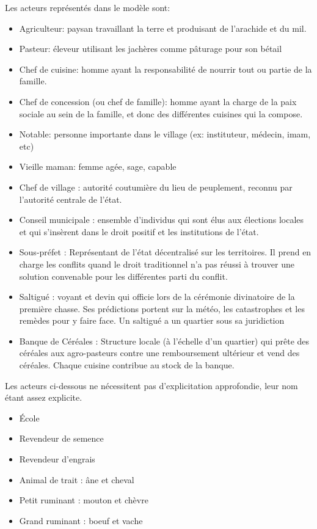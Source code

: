 Les acteurs représentés dans le modèle sont:
\begin{itemize}
\item Agriculteur: paysan travaillant la terre et produisant de l'arachide et du mil.
\item Pasteur: éleveur utilisant les jachères comme pâturage pour son bétail
\item Chef de cuisine: homme ayant la responsabilité de nourrir tout ou partie de la famille.
\item Chef de concession (ou chef de famille): homme ayant la charge de la paix sociale au sein de la famille, et donc des différentes cuisines qui la compose.
\item Notable: personne importante dans le village (ex: instituteur, médecin, imam, etc)
\item Vieille maman:  femme agée, sage, capable 
\item Chef de village : autorité coutumière du lieu de peuplement, reconnu par l'autorité centrale de l'état. 
\item Conseil municipale : ensemble d'individus qui sont élus aux élections locales et qui s'insèrent dans le droit positif et les institutions de l'état.
\item Sous-préfet : Représentant de l'état décentralisé sur les territoires. Il prend en charge les conflits quand le droit traditionnel n'a pas réussi à trouver une solution convenable pour les différentes parti du conflit.
\item Saltigué : voyant et devin qui officie lors de la cérémonie divinatoire de la première chasse. Ses prédictions portent sur la météo, les catastrophes et les remèdes pour y faire face. Un saltigué a un quartier sous sa juridiction
\item Banque de Céréales : Structure locale (à l'échelle d'un quartier) qui prête des céréales aux agro-pasteurs contre une remboursement ultérieur et vend des céréales. Chaque cuisine contribue au stock de la banque.
\end{itemize}

Les acteurs ci-dessous ne nécessitent pas d'explicitation approfondie, leur nom étant assez explicite.

\begin{itemize}
\item École
\item Revendeur de semence
\item Revendeur d'engrais
\item Animal de trait : âne et cheval
\item Petit ruminant : mouton et chèvre
\item Grand ruminant : boeuf et vache
\end{itemize}

